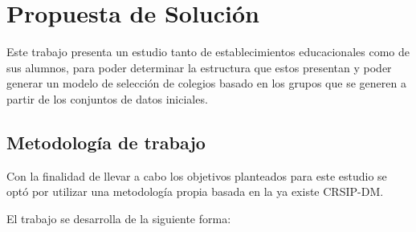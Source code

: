 \chapter{Propuesta de Solución}

Este trabajo presenta un estudio tanto de establecimientos educacionales como de sus alumnos, para poder determinar la estructura que estos presentan y poder generar un modelo de selección de colegios basado en los grupos que se generen a partir de los conjuntos de datos iniciales.

\section{Metodología de trabajo}

Con la finalidad de llevar a cabo los objetivos planteados para este estudio se optó por utilizar una metodología propia basada en la ya existe CRSIP-DM. 

El trabajo se desarrolla de la siguiente forma:

